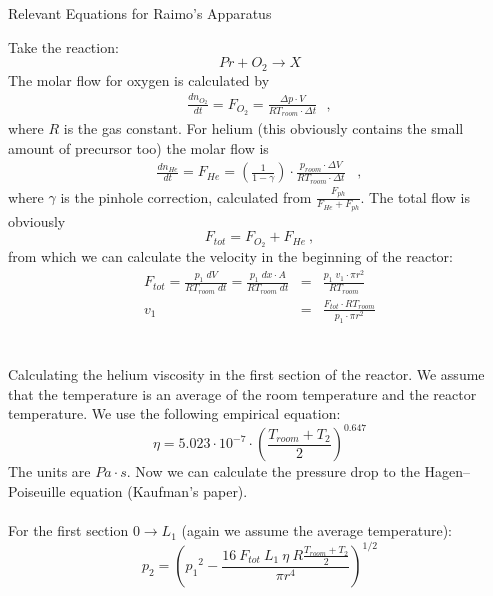 \documentclass[10pt, a4paper]{article}
\begin{document}
\begin{center}
\begin{huge}
Relevant Equations for Raimo's Apparatus
\end{huge}
\end{center}
Take the reaction: 
\begin{equation*}
Pr + O_2 \rightarrow X
\end{equation*}
The molar flow for oxygen is calculated by 
\begin{eqnarray*}
\frac{dn_{O_2}}{dt} = F_{O_2} = \frac{\Delta p \cdot V}{RT_{room} \cdot \Delta t} \:\:\:, 
\end{eqnarray*}
where $R$ is the gas constant. For helium (this obviously contains the small amount of precursor too) the molar flow is 
\begin{eqnarray*}
\frac{dn_{He}}{dt} = F_{He} = \left( \frac{1}{1 - \gamma} \right) \cdot \frac{p_{room} \cdot \Delta V}{RT_{room} \cdot \Delta t} \;\;\;,
\end{eqnarray*}
where $\gamma$ is the pinhole correction, calculated from $ \frac{F_{ph}}{F_{He} + F_{ph}} $. The total flow is obviously 
\begin{equation*}
F_{tot} = F_{O_2} + F_{He} \:, 
\end{equation*}
from which we can calculate the velocity in the beginning of the reactor: 
\begin{eqnarray*}
F_{tot} = \frac{p_1\;dV}{RT_{room}\;dt} = \frac{p_1\; dx \cdot A}{RT_{room}\;dt} &=& \frac{p_1\; v_1 \cdot \pi r^2}{RT_{room}} \\
v_1 &=& \frac{F_{tot} \cdot RT_{room}}{p_1 \cdot \pi r^2}
\end{eqnarray*}
\\
\\
Calculating the helium viscosity in the first section of the reactor. We assume that the temperature is an average of the room temperature and the reactor temperature. We use the following empirical equation: 
\begin{equation*}
\eta = 5.023\cdot 10^{-7} \cdot \left( \frac{T_{room} + T_2}{2} \right)^{0.647} 
\end{equation*}
The units are $Pa \cdot s$. Now we can calculate the pressure drop to the Hagen–Poiseuille equation (Kaufman's paper). 
\\
\\
For the first section $0 \rightarrow L_1$ (again we assume the average temperature): 
\begin{equation*}
p_2 = \left( {p_1}^2 - \frac{16\:F_{tot} \: L_1 \: \eta \: R\frac{T_{room} + T_2}{2}}{\pi r^4} \right)^{1/2}
\end{equation*}
\end{document}

